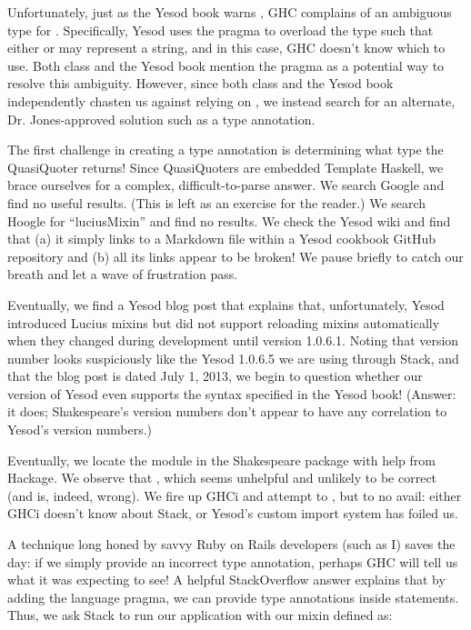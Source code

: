 Unfortunately, just as the Yesod book warns \cite{ybkHaskell}, GHC complains of an ambiguous type for . Specifically, Yesod uses the  pragma to overload the  type such that either  or  may represent a string, and in this case, GHC doesn't know which to use. Both class and the Yesod book mention the  pragma as a potential way to resolve this ambiguity. However, since both class and the Yesod book independently chasten us against relying on , we instead search for an alternate, Dr. Jones-approved solution such as a type annotation.

The first challenge in creating a type annotation is determining what type the QuasiQuoter returns! Since QuasiQuoters are embedded Template Haskell, we brace ourselves for a complex, difficult-to-parse answer. We search Google and find no useful results. (This is left as an exercise for the reader.) We search Hoogle for ``luciusMixin'' and find no results. We check the Yesod wiki \cite{yesodWiki} and find that (a) it simply links to a Markdown file within a Yesod cookbook GitHub repository and (b) all its links appear to be broken! We pause briefly to catch our breath and let a wave of frustration pass.

Eventually, we find a Yesod blog post \cite{yesodBlogShakespeareCSS} that explains that, unfortunately, Yesod introduced Lucius mixins but did not support reloading mixins automatically when they changed during development until version 1.0.6.1. Noting that version number looks suspiciously like the Yesod 1.0.6.5 we are using through Stack, and that the blog post is dated July 1, 2013, we begin to question whether our version of Yesod even supports the syntax specified in the Yesod book! (Answer: it does; Shakespeare's version numbers don't appear to have any correlation to Yesod's version numbers.)

Eventually, we locate the  module \cite{apiTextLucius} in the Shakespeare package with help from Hackage. We observe that , which seems unhelpful and unlikely to be correct (and is, indeed, wrong). We fire up GHCi and attempt to , but to no avail: either GHCi doesn't know about Stack, or Yesod's custom import system has foiled us.

A technique long honed by savvy Ruby on Rails developers (such as I) saves the day: if we simply provide an incorrect type annotation, perhaps GHC will tell us what it was expecting to see! A helpful StackOverflow answer \cite{soLetTypes} explains that by adding the  language pragma, we can provide type annotations inside  statements. Thus, we ask Stack to run our application with our mixin defined as:

